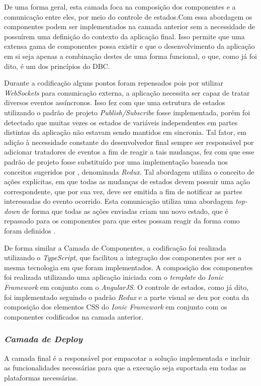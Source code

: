 De uma forma geral, esta camada foca na composição dos componentes e a comunicação entre eles, por meio do controle de estados.Com essa abordagem os componentes podem ser implementados na camada anterior sem a necessidade de possuírem uma definição do contexto da aplicação final. Isso permite que uma extensa gama de componentes possa existir e que o desenvolvimento da aplicação em si seja apenas a combinação destes de uma forma funcional, o que, como já foi dito, é um dos princípios do DBC.

Durante a codificação alguns pontos foram repensados pois por utilizar \textit{WebSockets} para comunicação externa, a aplicação necessita ser capaz de tratar diversos eventos assíncronos. Isso fez com que uma estrutura de estados utilizando o padrão de projeto \textit{Publish/Subscribe} fosse implementada, porém  foi detectado que muitas vezes os estados de variáveis independentes em partes distintas da aplicação não estavam sendo mantidos em sincronia. Tal fator, em adição à necessidade constante do desenvolvedor final sempre ser responsável por adicionar tratadores de eventos a fim de reagir a tais mudanças, fez com que esse padrão de projeto fosse substituído por uma implementação baseada nos conceitos sugeridos por \cite{presentContainerAbramov}, denominada \textit{Redux}. Tal abordagem utiliza o conceito de ações explícitas, em que todas as mudanças de estados devem possuir uma ação correspondente, que por sua vez, deve ser emitida a fim de notificar as partes interessadas do evento ocorrido. Esta comunicação utiliza uma abordagem \textit{top-down} de forma que todas as ações enviadas criam um novo estado, que é repassado para os componentes para que estes possam reagir da forma como foram definidos \cite{redux}.

De forma similar a Camada de Componentes, a codificação foi realizada utilizando o \textit{TypeScript}, que facilitou a integração dos componentes por ser a mesma tecnologia em que foram implementados. A composição dos componentes foi realizada utilizando uma aplicação iniciada com o \textit{template} do \textit{Ionic Framework} em conjunto com o \textit{AngularJS}. O controle de estados, como já dito, foi implementado seguindo o padrão \textit{Redux} e a parte visual se deu por conta da composição dos elementos CSS do \textit{Ionic Framework} em conjunto com os componentes codificados na camada anterior.


\subsubsection{{\it Camada de Deploy}}
A camada final é a responsável por empacotar a solução implementada e incluir as funcionalidades necessárias para que a execução seja suportada em todas as plataformas necessárias. 

